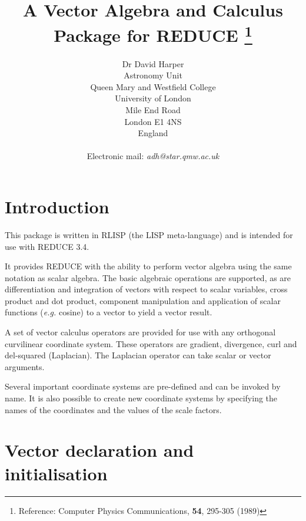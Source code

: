 

\title{A Vector Algebra and Calculus Package for REDUCE
\footnote{Reference: Computer Physics Communications, {\bf 54}, 295-305 (1989)}}
 
\author{
Dr David Harper \\
Astronomy Unit \\
Queen Mary and Westfield College \\
University of London \\
Mile End Road \\
London E1 4NS \\
England \\
\\
Electronic mail: {\it adh@star.qmw.ac.uk} \\
}

\maketitle

\section{Introduction}

This package is written in RLISP (the LISP meta-language) and is
intended for use with REDUCE 3.4.

It provides REDUCE with the ability to perform vector algebra
using the same notation as scalar algebra.  The basic algebraic
operations are supported, as are differentiation and integration
of vectors with respect to scalar variables, cross product and
dot product, component manipulation and application of scalar
functions ({\em e.g.} cosine) to a vector to yield a vector result.

A set of vector calculus operators are provided for use with
any orthogonal curvilinear coordinate system. These operators
are gradient, divergence, curl and del-squared (Laplacian).
The Laplacian operator can take scalar or vector arguments.

Several important coordinate systems are pre-defined and can
be invoked by name. It is also possible to create new
coordinate systems by specifying the names of the coordinates
and the values of the scale factors.

\section{Vector declaration and initialisation}

